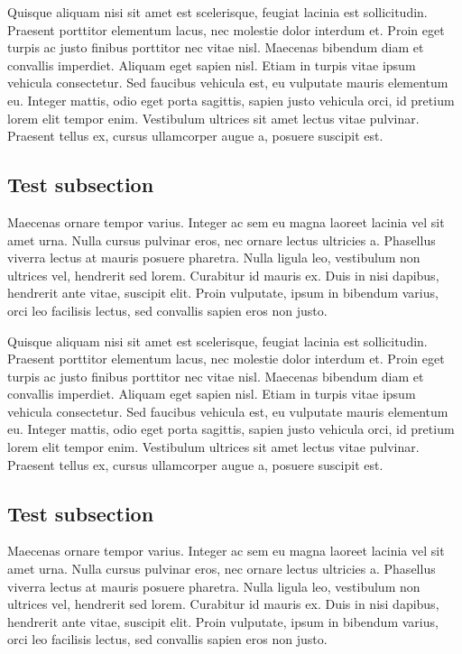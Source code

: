 Quisque aliquam nisi sit amet est scelerisque, feugiat lacinia est sollicitudin. Praesent porttitor elementum lacus, nec molestie dolor interdum et. Proin eget turpis ac justo finibus porttitor nec vitae nisl. Maecenas bibendum diam et convallis imperdiet. Aliquam eget sapien nisl. Etiam in turpis vitae ipsum vehicula consectetur. Sed faucibus vehicula est, eu vulputate mauris elementum eu. Integer mattis, odio eget porta sagittis, sapien justo vehicula orci, id pretium lorem elit tempor enim. Vestibulum ultrices sit amet lectus vitae pulvinar. Praesent tellus ex, cursus ullamcorper augue a, posuere suscipit est.

\subsection{Test subsection}
Maecenas ornare tempor varius. Integer ac sem eu magna laoreet lacinia vel sit amet urna. Nulla cursus pulvinar eros, nec ornare lectus ultricies a. Phasellus viverra lectus at mauris posuere pharetra. Nulla ligula leo, vestibulum non ultrices vel, hendrerit sed lorem. Curabitur id mauris ex. Duis in nisi dapibus, hendrerit ante vitae, suscipit elit. Proin vulputate, ipsum in bibendum varius, orci leo facilisis lectus, sed convallis sapien eros non justo.

Quisque aliquam nisi sit amet est scelerisque, feugiat lacinia est sollicitudin. Praesent porttitor elementum lacus, nec molestie dolor interdum et. Proin eget turpis ac justo finibus porttitor nec vitae nisl. Maecenas bibendum diam et convallis imperdiet. Aliquam eget sapien nisl. Etiam in turpis vitae ipsum vehicula consectetur. Sed faucibus vehicula est, eu vulputate mauris elementum eu. Integer mattis, odio eget porta sagittis, sapien justo vehicula orci, id pretium lorem elit tempor enim. Vestibulum ultrices sit amet lectus vitae pulvinar. Praesent tellus ex, cursus ullamcorper augue a, posuere suscipit est.

\subsection{Test subsection}
Maecenas ornare tempor varius. Integer ac sem eu magna laoreet lacinia vel sit amet urna. Nulla cursus pulvinar eros, nec ornare lectus ultricies a. Phasellus viverra lectus at mauris posuere pharetra. Nulla ligula leo, vestibulum non ultrices vel, hendrerit sed lorem. Curabitur id mauris ex. Duis in nisi dapibus, hendrerit ante vitae, suscipit elit. Proin vulputate, ipsum in bibendum varius, orci leo facilisis lectus, sed convallis sapien eros non justo.

